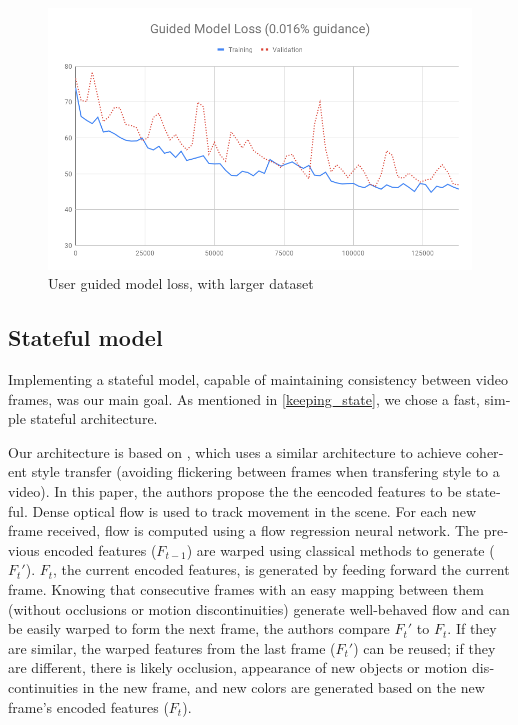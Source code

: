 \documentclass[12pt,openright,oneside,a4paper,english]{abntex2}
\begin{document}
\begin{otherlanguage}{english}
\begin{figure}[!htb]
\centering
\includegraphics[width=\textwidth]{loss/Guided_0_016}
\caption{User guided model loss, with larger dataset}
\label{loss_0_016}
\end{figure}

\subsection{Stateful model}

Implementing a stateful model, capable of maintaining consistency between video frames, was our main goal. As mentioned in \ref{keeping_state}, we chose a fast, simple stateful architecture.

Our architecture is based on \cite{MSFT_transfer}, which uses a similar architecture to achieve coherent style transfer (avoiding flickering between frames when transfering style to a video). In this paper, the authors propose the the eencoded features to be stateful. Dense optical flow is used to track movement in the scene. For each new frame received, flow is computed using a flow regression neural network. The previous encoded features ($F_{t-1}$) are warped using classical methods to generate ($F_t'$). $F_t$, the current encoded features, is generated by feeding forward the current frame. Knowing that consecutive frames with an easy mapping between them (without occlusions or motion discontinuities) generate well-behaved flow and can be easily warped to form the next frame, the authors compare $F_t'$ to $F_t$. If they are similar, the warped features from the last frame ($F_t'$) can be reused; if they are different, there is likely occlusion, appearance of new objects or motion discontinuities in the new frame, and new colors are generated based on the new frame's encoded features ($F_t$).


\end{otherlanguage}
\end{document}
